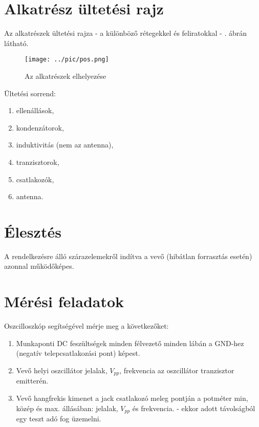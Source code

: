 \newpage
\section{Alkatrész ültetési rajz}

Az alkatrészek ültetési rajza - a különböző rétegekkel és feliratokkal - . ábrán látható.

\begin{figure}[H]
\centering
\texttt{[image: ../pic/pos.png]}
\caption{Az alkatrészek elhelyezése}
\label{fig:rokault}
\end{figure}

Ültetési sorrend:

\begin{enumerate}
\item ellenállások,
\item kondenzátorok,
\item induktivitás (nem az antenna),
\item tranzisztorok,
\item csatlakozók,
\item antenna.
\end{enumerate}

\newpage
\section{Élesztés}

A rendelkezésre álló szárazelemekről indítva a vevő (hibátlan forrasztás esetén) azonnal működőképes.

\section{Mérési feladatok}

Oszcilloszkóp segítségével mérje meg a következőket:

\begin{enumerate}
\item Munkaponti DC feszültségek minden félvezető minden lábán a GND-hez (negatív telepcsatlakozási pont) képest.
\item Vevő helyi oszcillátor jelalak, $V_{pp}$, frekvencia az oszcillátor tranzisztor emitterén.
\item Vevő hangfrekis kimenet a jack csatlakozó meleg pontján a potméter min, közép és max. állásában: jelalak, $V_{pp}$ és frekvencia. - ekkor adott távolságból egy teszt adó fog üzemelni.
\end{enumerate}